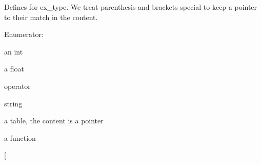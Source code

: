 Defines for ex\_\-type. We treat parenthesis and brackets special to keep a pointer to their match in the content. \begin{Desc}
\item[Enumerator: ]\par
\begin{description}
\item[{\em 
\hypertarget{group__expr_gga64f1e232097cbd73318392635e6bab0ea099243d5b48eaf0e63699c974b587abf}{
ET\_\-INT}
\label{group__expr_gga64f1e232097cbd73318392635e6bab0ea099243d5b48eaf0e63699c974b587abf}
}]an int \item[{\em 
\hypertarget{group__expr_gga64f1e232097cbd73318392635e6bab0ea968ca4519aba1e3b947f8b71fd8fe623}{
ET\_\-FLT}
\label{group__expr_gga64f1e232097cbd73318392635e6bab0ea968ca4519aba1e3b947f8b71fd8fe623}
}]a float \item[{\em 
\hypertarget{group__expr_gga64f1e232097cbd73318392635e6bab0ea617f0c0aa78a4df760188842fafbeda1}{
ET\_\-OP}
\label{group__expr_gga64f1e232097cbd73318392635e6bab0ea617f0c0aa78a4df760188842fafbeda1}
}]operator \item[{\em 
\hypertarget{group__expr_gga64f1e232097cbd73318392635e6bab0eadff34cf618701594e4cd4d2d5ff439e8}{
ET\_\-STR}
\label{group__expr_gga64f1e232097cbd73318392635e6bab0eadff34cf618701594e4cd4d2d5ff439e8}
}]string \item[{\em 
\hypertarget{group__expr_gga64f1e232097cbd73318392635e6bab0ea82f625c02be30bf2cea5c2daede0f148}{
ET\_\-TBL}
\label{group__expr_gga64f1e232097cbd73318392635e6bab0ea82f625c02be30bf2cea5c2daede0f148}
}]a table, the content is a pointer \item[{\em 
\hypertarget{group__expr_gga64f1e232097cbd73318392635e6bab0eaf061cdcc33a494b192516b0a2bbd1451}{
ET\_\-FUNC}
\label{group__expr_gga64f1e232097cbd73318392635e6bab0eaf061cdcc33a494b192516b0a2bbd1451}
}]a function \item[{\em 
\hypertarget{group__expr_gga64f1e232097cbd73318392635e6bab0ea858df3673d71d9b70bde311f8996ac3c}{
}}
\end{description}
\end{Desc}
